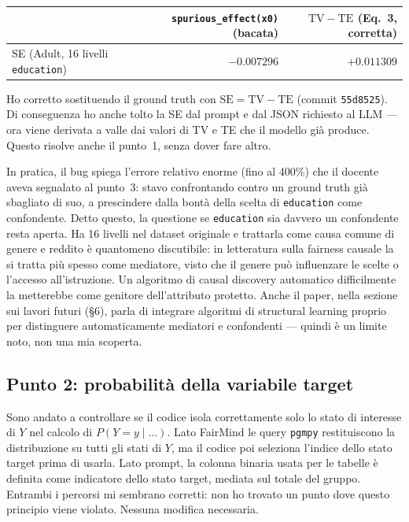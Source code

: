 \begin{center}
\begin{tabular}{lrr}
\toprule
 & \texttt{spurious\_effect(x0)} (bacata) & $\mathrm{TV}-\mathrm{TE}$ (Eq.~3, corretta) \\
\midrule
SE (Adult, 16 livelli \texttt{education}) & $-0.007296$ & $+0.011309$ \\
\bottomrule
\end{tabular}
\end{center}

Ho corretto sostituendo il ground truth con $\mathrm{SE} = \mathrm{TV}-\mathrm{TE}$ (commit \texttt{55d8525}). Di conseguenza ho anche tolto la SE dal prompt e dal JSON richiesto al LLM --- ora viene derivata a valle dai valori di TV e TE che il modello già produce. Questo risolve anche il punto~1, senza dover fare altro.

In pratica, il bug spiega l'errore relativo enorme (fino al 400\%) che il docente aveva segnalato al punto~3: stavo confrontando contro un ground truth già sbagliato di suo, a prescindere dalla bontà della scelta di \texttt{education} come confondente. Detto questo, la questione se \texttt{education} sia davvero un confondente resta aperta. Ha 16 livelli nel dataset originale e trattarla come causa comune di genere e reddito è quantomeno discutibile: in letteratura sulla fairness causale la si tratta più spesso come mediatore, visto che il genere può influenzare le scelte o l'accesso all'istruzione. Un algoritmo di causal discovery automatico difficilmente la metterebbe come genitore dell'attributo protetto. Anche il paper, nella sezione sui lavori futuri (\S6), parla di integrare algoritmi di structural learning proprio per distinguere automaticamente mediatori e confondenti --- quindi è un limite noto, non una mia scoperta.

\subsection*{Punto 2: probabilità della variabile target}

Sono andato a controllare se il codice isola correttamente solo lo stato di interesse di $Y$ nel calcolo di $P(Y=y\mid\ldots)$. Lato FairMind le query \texttt{pgmpy} restituiscono la distribuzione su tutti gli stati di $Y$, ma il codice poi seleziona l'indice dello stato target prima di usarla. Lato prompt, la colonna binaria usata per le tabelle è definita come indicatore dello stato target, mediata sul totale del gruppo. Entrambi i percorsi mi sembrano corretti: non ho trovato un punto dove questo principio viene violato. Nessuna modifica necessaria.

